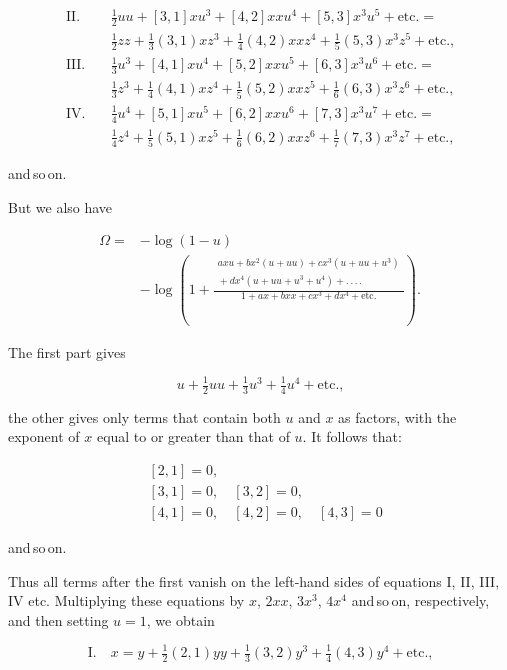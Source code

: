 \[
\begin{aligned}
\text{II.}\quad & \tfrac12 uu+[3,1]xu^3+[4,2]xxu^4+[5,3]x^3u^5+\text{etc.} = \\
& \tfrac12 zz+\tfrac13(3,1)xz^3+\tfrac14(4,2)xxz^4+\tfrac15(5,3)x^3z^5+\text{etc.,}\\[6pt]
\text{III.}\quad & \tfrac13 u^3+[4,1]xu^4+[5,2]xxu^5+[6,3]x^3u^6+\text{etc.} = \\
& \tfrac13 z^3+\tfrac14(4,1)xz^4+\tfrac15(5,2)xxz^5+\tfrac16(6,3)x^3z^6+\text{etc.,}\\[6pt]
\text{IV.}\quad & \tfrac14 u^4+[5,1]xu^5+[6,2]xxu^6+[7,3]x^3u^7+\text{etc.} = \\
& \tfrac14 z^4+\tfrac15(5,1)xz^5+\tfrac16(6,2)xxz^6+\tfrac17(7,3)x^3z^7+\text{etc.,}
\end{aligned}
\]

\noindent and\,so\,on.

But we also have

\[
\begin{aligned}\Omega ={}& -\log(1-u)\\ &-\log\left(1+\frac{\begin{gathered}axu+bx^2(u+uu)+cx^3(u+uu+u^3)\\ {}+dx^4(u+uu+u^3+u^4)+.\,.\,.\,.\end{gathered}}{1+ax+bxx+cx^3+dx^4+\text{etc.}}\right).
\end{aligned}
\]

The first part gives

\[
u+\tfrac12 uu+\tfrac13 u^3+\tfrac14 u^4+\text{etc.,}
\]

\noindent the other gives only terms that contain both $u$ and $x$ as factors, with the exponent of $x$ equal to or greater than that of $u$. It follows that:

\[
\begin{aligned}
& [2,1]=0,\\
& [3,1]=0,\quad [3,2]=0,\\
& [4,1]=0,\quad [4,2]=0,\quad [4,3]=0
\end{aligned}
\]

\noindent and\,so\,on.

Thus all terms after the first vanish on the left-hand sides of equations I, II, III, IV etc. Multiplying these equations by $x$, $2xx$, $3x^3$, $4x^4$ and\,so\,on, respectively, and then setting $u=1$, we obtain

\[\text{I.}\quad x = y + \tfrac12(2,1)yy+\tfrac13(3,2)y^3+\tfrac14(4,3)y^4+\text{etc.,}\]

